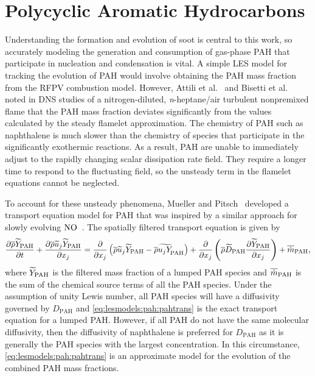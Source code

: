 \section{Polycyclic Aromatic Hydrocarbons}
\label{sec:lesmodels:pah}

Understanding the formation and evolution of soot is central to this work, so accurately modeling the generation and consumption of gas-phase PAH that participate in nucleation and condensation is vital. A simple LES model for tracking the evolution of PAH would involve obtaining the PAH mass fraction from the RFPV combustion model. However, Attili et al.~\cite{attili2014} and Bisetti et al.~\cite{bisetti2012} noted in DNS studies of a nitrogen-diluted, \textit{n}-heptane/air turbulent nonpremixed flame that the PAH mass fraction deviates significantly from the values calculated by the steady flamelet approximation. The chemistry of PAH such as naphthalene is much slower than the chemistry of species that participate in the significantly exothermic reactions. As a result, PAH are unable to immediately adjust to the rapidly changing scalar dissipation rate field. They require a longer time to respond to the fluctuating field, so the unsteady term in the flamelet equations cannot be neglected.

To account for these unsteady phenomena, Mueller and Pitsch~\cite{mueller2012} developed a transport equation model for PAH that was inspired by a similar approach for slowly evolving $\ce{NO}$~\cite{ihme2008}. The spatially filtered transport equation is given by
\begin{equation}\label{eq:lesmodels:pah:pahtrans}
  \ftrder{\tf{Y}_{\text{PAH}}} = \dsff[\tf{Y}_{\text{PAH}}]{\tf{u_j Y}_{\hspace{-3pt}\text{PAH}}} + \fdt[\text{PAH}]{\tf{Y}_{\text{PAH}}} + \fst[m]{\text{PAH}},
\end{equation}
where $\tf{Y}_{\text{PAH}}$ is the filtered mass fraction of a lumped PAH species and $\fst[m]{\text{PAH}}$ is the sum of the chemical source terms of all the PAH species. Under the assumption of unity Lewis number, all PAH species will have a diffusivity governed by $D_{\text{PAH}}$ and \cref{eq:lesmodels:pah:pahtrans} is the exact transport equation for a lumped PAH. However, if all PAH do not have the same molecular diffusivity, then the diffusivity of naphthalene is preferred for $D_{\text{PAH}}$ as it is generally the PAH species with the largest concentration. In this circumstance, \cref{eq:lesmodels:pah:pahtrans} is an approximate model for the evolution of the combined PAH mass fractions.

